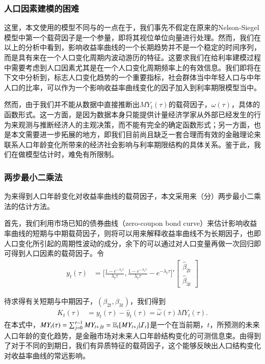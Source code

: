 \subsubsection{人口因素建模的困难}
 
 这里，本文使用的模型不同与\dns{}的一点在于，我们事先不假定在原来的Nelson-Siegel模型中第一个载荷因子是一个参量，即将其视位单位向量进行处理。然而，我们在以上的分析中看到，影响收益率曲线的一个长期趋势并不是一个稳定的时间序列，而是具有来在一个人口变化周期内波动游历的特征。这要求我们在给利率建模过程中需要考虑到人口因素尤其是在一个人口变化周期频率上的有效信息。我们即将在下文中分析到，标志人口变化趋势的一个重要指标，社会群体当中年轻人口与中年人口的比率，可以作为一个影响收益率曲线变化的因子加入到利率期限模型当中。
 
 然而，由于我们并不能从数据中直接推断出$MY_{t}(\tau)$的载荷因子，$\omega(\tau)$，具体的函数形式。这一方面，是因为数据本身只能提供计量经济学家从外部已经发生的行为来观测与推断经济人的主观决策，而不能有完全的确定函数形式；另一方面，也是本文需要进一步拓展的地方，即我们目前尚且缺乏一套合理而有效的金融理论来联系人口年龄变化所带来的经济社会影响与利率期限结构的具体关系。鉴于此，我们在做模型估计时，难免有所限制。
 
 \subsubsection{两步最小二乘法}
  
  为来得到人口年龄变化对收益率曲线的载荷因子，本文采用来（分）两步最小二乘法的估计方法。
  
  首先，我们利用市场已知的债券曲线（zero-coupon bond curve）来估计影响收益率曲线的短期与中期载荷因子，则将可以用来解释收益率曲线不为长期因子，也即人口变化所引起的周期性波动的成分，余下的可以通过对人口变量再做一次回归即可得到人口因素的载荷因子。令
  \begin{align}
   y_t(\tau) &= \bigg[ \frac{1-e^{-\lambda_{t} \tau}} {\lambda_{t} \tau} , \frac{1-e^{-\lambda_{t} \tau}} {\lambda_{t} \tau} - e^{-\lambda_{t} \tau}  \bigg] ' 
   \begin{bmatrix}
    \hat{\beta}_{2t} \\
   \hat{\beta}_{3t} 
   \end{bmatrix}
  \end{align}
  
  待求得有关短期与中期因子，$(\beta_{2t},\beta_{3t})$，我们得到
  \begin{align*}
   K_t(\tau) &= y_t(\tau) - \hat{y}_t(\tau) = \hat{\omega}(\tau) MY_t(\tau). \label{2slse02}
  \end{align*}
  在本式中，$MY_{t}(\tau) = \sum_{j=0}^{\tau-1}MY_{t+j|t} = \mathbb{E}_t [MY_{t+j}|\mathcal{I}_t]$是一个在当前期，$t$，所预测的未来人口年龄的变化趋势，是金融市场对未来人口年龄结构变化的可测信息束。由得到了对于不同的到期日，我们有异质特征的载荷因子，这个能够反映出人口结构变化对收益率曲线的常远影响。
  
